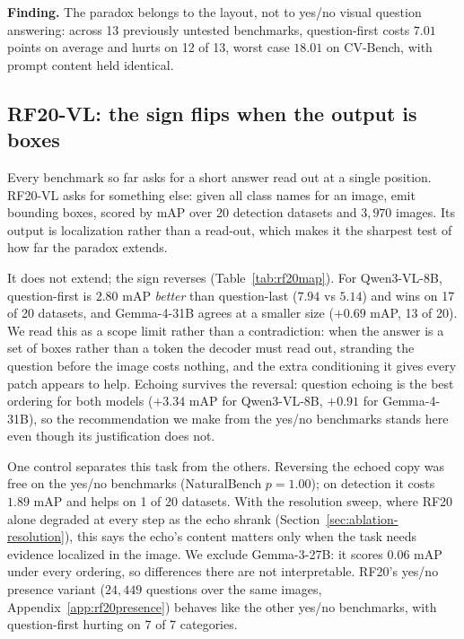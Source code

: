 \begin{finding}
\textbf{Finding.} The paradox belongs to the layout, not to yes/no visual
question answering: across 13 previously untested benchmarks, question-first
costs $7.01$ points on average and hurts on 12 of 13, worst case $18.01$ on
CV-Bench, with prompt content held identical.
\end{finding}

\subsection{RF20-VL: the sign flips when the output is boxes}
\label{sec:generality-rf20}

Every benchmark so far asks for a short answer read out at a single position.
RF20-VL asks for something else: given all class names for an image, emit
bounding boxes, scored by mAP over 20 detection datasets and $3{,}970$ images.
Its output is localization rather than a read-out, which makes it the sharpest
test of how far the paradox extends.

It does not extend; the sign reverses (Table~\ref{tab:rf20map}). For
Qwen3-VL-8B, question-first is $2.80$ mAP \emph{better} than question-last
($7.94$ vs $5.14$) and wins on 17 of 20 datasets, and Gemma-4-31B agrees at a
smaller size ($+0.69$ mAP, 13 of 20). We read this as a scope limit rather than
a contradiction: when the answer is a set of boxes rather than a token the
decoder must read out, stranding the question before the image costs nothing,
and the extra conditioning it gives every patch appears to help. Echoing
survives the reversal: question echoing is the best ordering for both models
($+3.34$ mAP for Qwen3-VL-8B, $+0.91$ for Gemma-4-31B), so the recommendation we
make from the yes/no benchmarks stands here even though its justification does
not.

One control separates this task from the others. Reversing the echoed copy was
free on the yes/no benchmarks (NaturalBench $p = 1.00$); on detection it costs
$1.89$ mAP and helps on 1 of 20 datasets. With the resolution sweep, where RF20
alone degraded at every step as the echo shrank
(Section~\ref{sec:ablation-resolution}), this says the echo's content matters
only when the task needs evidence localized in the image. We exclude
Gemma-3-27B: it scores $0.06$ mAP under every ordering, so differences there are
not interpretable. RF20's yes/no presence variant ($24{,}449$ questions over the
same images, Appendix~\ref{app:rf20presence}) behaves like the other yes/no
benchmarks, with question-first hurting on 7 of 7 categories.

